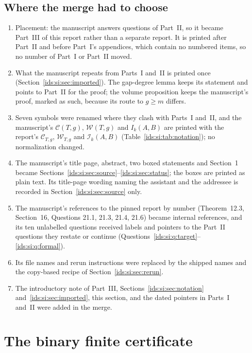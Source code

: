 \documentclass[11pt,letterpaper]{article}
\theoremstyle{definition}\newtheorem{definition}[theorem]{Definition}
\theoremstyle{remark}\newtheorem{remark}[theorem]{Remark}
\theoremstyle{definition}\newtheorem{question}[theorem]{Question}
\newcommand{\ins}[3]{\mathcal I_{#1}(#2,#3)}
\newcommand{\bpC}[2]{\mathcal C_{#1,#2}}
\newcommand{\bpW}[2]{\mathcal W_{#1,#2}}
\begin{document}
\subsection{Where the merge had to choose}\label{ids:si:sec:choices}
\begin{enumerate}[nosep]
\item Placement: the manuscript answers questions of Part~II, so it became
Part~III of this report rather than a separate report. It is printed after
Part~II and before Part~I's appendices, which contain no numbered items, so
no number of Part~I or Part~II moved.
\item What the manuscript repeats from Parts~I and~II is printed once
(Section~\ref{ids:si:sec:imported}). The gap-degree lemma keeps its statement
and points to Part~II for the proof; the volume proposition keeps the
manuscript's proof, marked as such, because its route to $g\geq m$ differs.
\item Seven symbols were renamed where they clash with Parts~I and~II, and the
manuscript's $\mathcal C(T,g)$, $\mathcal W(T,g)$ and $I_k(A,B)$ are printed
with the report's $\bpC{T}{g}$, $\bpW{T}{g}$ and $\ins{k}{A}{B}$
(Table~\ref{ids:si:tab:notation}); no normalization changed.
\item The manuscript's title page, abstract, two boxed statements and
Section~1 became Sections~\ref{ids:si:sec:source}--\ref{ids:si:sec:status};
the boxes are printed as plain text. Its title-page wording naming the
assistant and the addressee is recorded in Section~\ref{ids:si:sec:source}
only.
\item The manuscript's references to the pinned report by number (Theorem~12.3,
Section~16, Questions 21.1, 21.3, 21.4, 21.6) became internal references, and
its ten unlabelled questions received labels and pointers to the Part~II
questions they restate or continue
(Questions~\ref{ids:si:q:target}--\ref{ids:si:q:formal}).
\item Its file names and rerun instructions were replaced by the shipped names
and the copy-based recipe of Section~\ref{ids:si:sec:rerun}.
\item The introductory note of Part~III,
Sections~\ref{ids:si:sec:notation} and~\ref{ids:si:sec:imported}, this
section, and the dated pointers in Parts~I and~II were added in the merge.
\end{enumerate}

\appendix
\section{The binary finite certificate}\label{app:binary}
\end{document}
